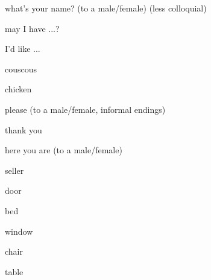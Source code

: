 \documentclass[avery5371,grid,frame]{flashcards}
\begin{document}
\begin{flashcard}{\LARGE what's your name? (to a male/female) (less colloquial)}
\LARGE {}
\end{flashcard}
\begin{flashcard}{\LARGE may I have ...?}
\LARGE {}
\end{flashcard}
\begin{flashcard}{\LARGE I'd like ...}
\LARGE {}
\end{flashcard}
\begin{flashcard}{\LARGE couscous}
\LARGE {}
\end{flashcard}
\begin{flashcard}{\LARGE chicken}
\LARGE {}
\end{flashcard}
\begin{flashcard}{\LARGE please (to a male/female, informal endings)}
\LARGE {}
\end{flashcard}
\begin{flashcard}{\LARGE thank you}
\LARGE {}
\end{flashcard}
\begin{flashcard}{\LARGE here you are (to a male/female)}
\LARGE {}
\end{flashcard}
\begin{flashcard}{\LARGE seller}
\LARGE {}
\end{flashcard}
\begin{flashcard}{\LARGE door}
\LARGE {}
\end{flashcard}
\begin{flashcard}{\LARGE bed}
\LARGE {}
\end{flashcard}
\begin{flashcard}{\LARGE window}
\LARGE {}
\end{flashcard}
\begin{flashcard}{\LARGE chair}
\LARGE {}
\end{flashcard}
\begin{flashcard}{\LARGE table}
\LARGE {}
\end{flashcard}
\end{document}
